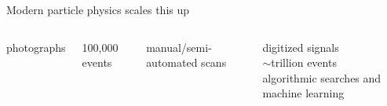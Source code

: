 \documentclass[aspectratio=169]{beamer}
\begin{document}
\begin{frame}{Modern particle physics scales this up}
\begin{columns}
\begin{center}
\begin{columns}
\centering
photographs

\vspace{0.5 cm}
100,000 events

\vspace{0.5 cm}
manual/semi-automated scans

\centering
digitized signals \\

\vspace{0.5 cm}
$\sim$trillion events \\

\vspace{0.5 cm}
algorithmic searches and machine learning
\end{columns}
\end{center}


\end{columns}
\end{frame}
\end{document}
